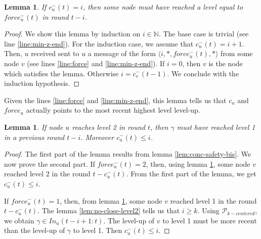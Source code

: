 \documentclass[11pt,letterpaper]{article}
\newtheorem{lem}[thm]{Lemma}
\newcommand{\cent}{\gamma}
\begin{document}
\begin{lem} \label{lem:safety-force}
	If $c_u^-(t) = i$, then some node must have reached a level equal to $force_u^-(t)$ in round $t-i$.
\end{lem}
\begin{proof}
	We show this lemma by induction on $i \in \mathds{N}$.
	The base case is trivial (see line \ref{line:min-z-end}).
	For the induction case, we assume that $c_u^-(t) = i+1$.
	Then, $u$ received sent to $u$ a message of the form $\langle i, *, force_u^-(t), * \rangle$ from some node $v$ (see lines \ref{line:force} and \ref{line:min-z-end}).
	If $i = 0$, then $v$ is the node which satisfies the lemma.
	Otherwise $i = c_v^-(t-1)$.
	We conclude with the induction hypothesis.
\end{proof}

Given the lines \ref{line:force} and \ref{line:min-z-end}, this lemma tells us that $c_u$ and $force_u$ actually points to the most recent highest level level-up.

\begin{lem} \label{lem:ready-safety}
	If node $u$ reaches level 2 in round $t$, then $\cent$ must have reached level 1 in a previous round $t-i$.
	Moreover $c^-_u(t) \leq i$.
\end{lem}
\begin{proof}
	The first part of the lemma results from lemma \ref{lem:conc-safety-bis}. We now prove the second part.
	If $force_u^-(t) = 2$, then, using lemma \ref{lem:safety-force}, some node $v$ reached level 2 in the round $t-c_u^-(t)$.
	From the first part of the lemma, we get $c_u^-(t) \leq i$. 

	If $force_u^-(t) = 1$, then, from lemma \ref{lem:safety-force}, some node $v$ reached level 1 in the round $t-c_u^-(t)$.
	The lemma \ref{lem:no-close-level2} tells us that $i \geq k$.
	Using $\mathcal{P}_{k-centered}$, we obtain $\cent \in In_u(t-i+1:t)$.
	The level-up of $v$ to level 1 must be more recent than the level-up of $\cent$ to level 1.
	Then $c_u^-(t) \leq i$.
\end{proof}
\end{document}
